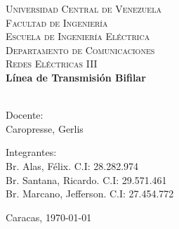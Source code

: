 \begin{titlepage}
    \begin{center}
        \textsc{ Universidad Central de Venezuela}\\
        \textsc{ Facultad de Ingeniería}\\
        \textsc{ Escuela de Ingeniería Eléctrica}\\
        \textsc{ Departamento de Comunicaciones}\\
        \textsc{Redes Eléctricas III}\\[7cm]

        
        {\Large \bfseries Línea de Transmisión Bifilar}\\[0.2cm]
        {\Large \ }\\[6cm]
        
        \begin{minipage}{0.4\textwidth}
            \begin{flushleft}
                {Docente:}\\
                Caropresse, Gerlis 
            \end{flushleft}
        \end{minipage}
        \begin{minipage}{0.4\textwidth}
            \begin{flushright}
                {Integrantes:}\\
                Br. Alas, Félix. C.I: 28.282.974 \\
                Br. Santana, Ricardo. C.I: 29.571.461 \\
                Br. Marcano, Jefferson. C.I: 27.454.772 \\
            \end{flushright}
        \end{minipage}
        
        \vfill
        
        { Caracas, \today} %
        
    \end{center}
\end{titlepage}